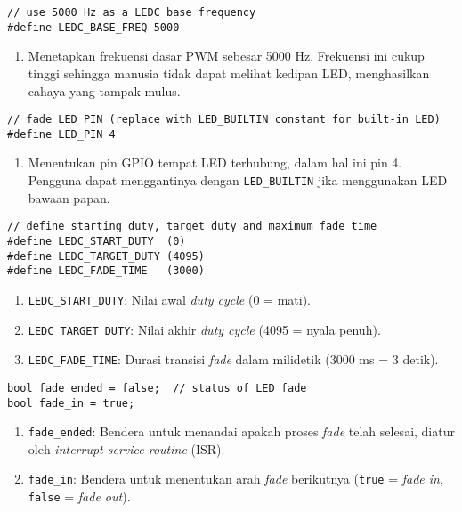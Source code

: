 \begin{verbatim}
// use 5000 Hz as a LEDC base frequency
#define LEDC_BASE_FREQ 5000
\end{verbatim}
\begin{enumerate}
    \item Menetapkan frekuensi dasar PWM sebesar 5000 Hz. Frekuensi ini cukup tinggi sehingga manusia tidak dapat melihat kedipan LED, menghasilkan cahaya yang tampak mulus.
\end{enumerate}

\begin{verbatim}
// fade LED PIN (replace with LED_BUILTIN constant for built-in LED)
#define LED_PIN 4
\end{verbatim}
\begin{enumerate}
    \item Menentukan pin GPIO tempat LED terhubung, dalam hal ini pin 4. Pengguna dapat menggantinya dengan \texttt{LED\_BUILTIN} jika menggunakan LED bawaan papan.
\end{enumerate}

\begin{verbatim}
// define starting duty, target duty and maximum fade time
#define LEDC_START_DUTY  (0)
#define LEDC_TARGET_DUTY (4095)
#define LEDC_FADE_TIME   (3000)
\end{verbatim}
\begin{enumerate}
    \item \texttt{LEDC\_START\_DUTY}: Nilai awal \textit{duty cycle} (0 = mati).
    \item \texttt{LEDC\_TARGET\_DUTY}: Nilai akhir \textit{duty cycle} (4095 = nyala penuh).
    \item \texttt{LEDC\_FADE\_TIME}: Durasi transisi \textit{fade} dalam milidetik (3000 ms = 3 detik).
\end{enumerate}

\begin{verbatim}
bool fade_ended = false;  // status of LED fade
bool fade_in = true;
\end{verbatim}
\begin{enumerate}
    \item \texttt{fade\_ended}: Bendera untuk menandai apakah proses \textit{fade} telah selesai, diatur oleh \textit{interrupt service routine} (ISR).
    \item \texttt{fade\_in}: Bendera untuk menentukan arah \textit{fade} berikutnya (\texttt{true} = \textit{fade in}, \texttt{false} = \textit{fade out}).
\end{enumerate}

